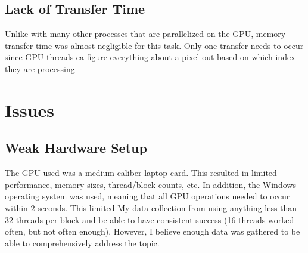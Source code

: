 \documentclass{article}
\begin{document}
\subsection{Lack of Transfer Time}
Unlike with many other processes that are parallelized on the GPU, memory transfer time was almost negligible for this task. Only one transfer needs to occur since GPU threads ca figure everything about a pixel out based on which index they are processing

\section{Issues}
\subsection{Weak Hardware Setup}
The GPU used was a medium caliber laptop card. This resulted in limited performance, memory sizes, thread/block counts, etc. In addition, the Windows operating system was used, meaning that all GPU operations needed to occur within $2$ seconds. This limited My data collection from using anything less than 32 threads per block and be able to have consistent success (16 threads worked often, but not often enough). However, I believe enough data was gathered to be able to comprehensively address the topic.
  
\end{document}
